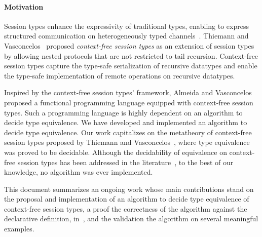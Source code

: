 \paragraph{Motivation}
\label{sec:introduction}

Session types enhance the expressivity of traditional types, enabling
to express structured communication on heterogeneously typed
channels~\cite{DBLP:conf/concur/Honda93,DBLP:conf/parle/TakeuchiHK94}.
Thiemann and
Vasconcelos~\cite{thiemann2016context} proposed {\it context-free
  session types} as an extension of session types by allowing nested
protocols that are not restricted to tail recursion. Context-free
session types capture the type-safe serialization of recursive
datatypes and enable the type-safe implementation of remote operations
on recursive datatypes.

Inspired by the context-free session types' framework, Almeida and
Vasconcelos~\cite{bernardo} proposed a functional programming language
equipped with context-free session types.  Such a programming language
is highly dependent on an algorithm to decide type equivalence. We
have developed and implemented an algorithm to decide type
equivalence. Our work capitalizes on the metatheory of context-free
session types proposed by Thiemann and
Vasconcelos~\cite{thiemann2016context}, where type equivalence was
proved to be decidable. Although the decidability of equivalence on
context-free session types has been addressed in the
literature~\cite{DBLP:journals/iandc/ChristensenHS95,janvcar1999techniques,thiemann2016context},
to the best of our knowledge, no algorithm was ever implemented.

This document summarizes an ongoing work whose main contributions
stand on the proposal and implementation of an algorithm to decide
type equivalence of context-free session types, a proof the correctness of
the algorithm against the declarative definition,
in~\cite{thiemann2016context}, %
and the validation the algorithm on several meaningful examples.


